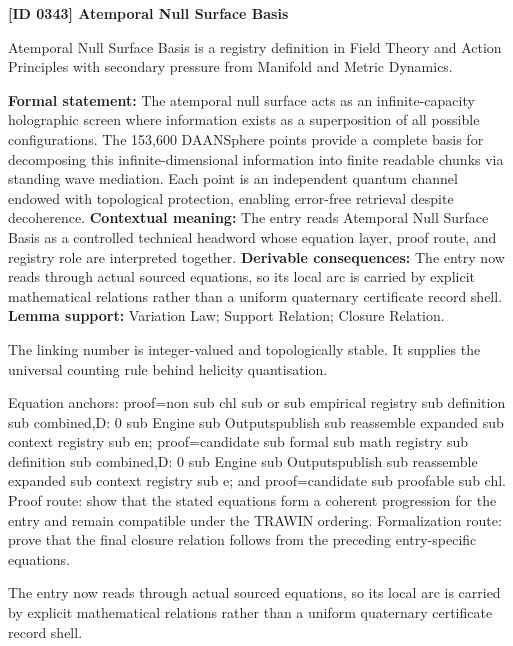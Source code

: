 \clearpage
\noindent\textbf{[ID 0343] Atemporal Null Surface Basis}\par
\vspace{0.35em}
\begingroup\small
{}
Atemporal Null Surface Basis is a registry definition in Field Theory and Action Principles with secondary pressure from Manifold and Metric Dynamics.

\begingroup\footnotesize\setlength{\emergencystretch}{3em}\sloppy
\textbf{Formal statement:} The atemporal null surface acts as an infinite-capacity holographic screen where information exists as a superposition of all possible configurations. The 153,600 DAANSphere points provide a complete basis for decomposing this infinite-dimensional information into finite readable chunks via standing wave mediation. Each point is an independent quantum channel endowed with topological protection, enabling error-free retrieval despite decoherence. \textbf{Contextual meaning:} The entry reads Atemporal Null Surface Basis as a controlled technical headword whose equation layer, proof route, and registry role are interpreted together. \textbf{Derivable consequences:} The entry now reads through actual sourced equations, so its local arc is carried by explicit mathematical relations rather than a uniform quaternary certificate record shell. \textbf{Lemma support:} Variation Law; Support Relation; Closure Relation.\par
\endgroup

The linking number is integer-valued and topologically stable. It supplies the universal counting rule behind helicity quantisation.

Equation anchors: proof=non sub chl sub or sub empirical registry sub definition sub combined,D: 0 sub Engine sub Outputspublish sub reassemble expanded sub context registry sub en; proof=candidate sub formal sub math registry sub definition sub combined,D: 0 sub Engine sub Outputspublish sub reassemble expanded sub context registry sub e; and proof=candidate sub proofable sub chl. Proof route: show that the stated equations form a coherent progression for the entry and remain compatible under the TRAWIN ordering. Formalization route: prove that the final closure relation follows from the preceding entry-specific equations.

The entry now reads through actual sourced equations, so its local arc is carried by explicit mathematical relations rather than a uniform quaternary certificate record shell.
\endgroup

